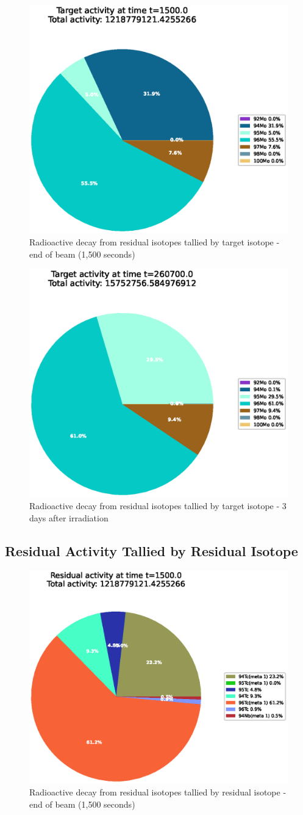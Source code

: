 \begin{figure}[htb]
\centering
\includegraphics[width=0.5\linewidth]{chapters/results_activity_code/mo-john-hewett/thick/target-activity/0100_1500.eps}
\caption{Radioactive decay from residual isotopes tallied by target isotope - end of beam (1,500 seconds)}
\label{fig:motargetisotopes1500s}
\end{figure}

\begin{figure}[htb]
\centering
\includegraphics[width=0.5\linewidth]{chapters/results_activity_code/mo-john-hewett/thick/target-activity/0400_260700.eps}
\caption{Radioactive decay from residual isotopes tallied by target isotope - 3 days after irradiation}
\label{fig:motargetisotopes3days}
\end{figure}


\FloatBarrier
\clearpage

\subsection{Residual Activity Tallied by Residual Isotope}

\begin{figure}[htb]
\centering
\includegraphics[width=0.5\linewidth]{chapters/results_activity_code/mo-john-hewett/thick/residual-activity/0100_1500.eps}
\caption{Radioactive decay from residual isotopes tallied by residual isotope - end of beam (1,500 seconds)}
\label{fig:moresidualisotopes1500s}
\end{figure}

